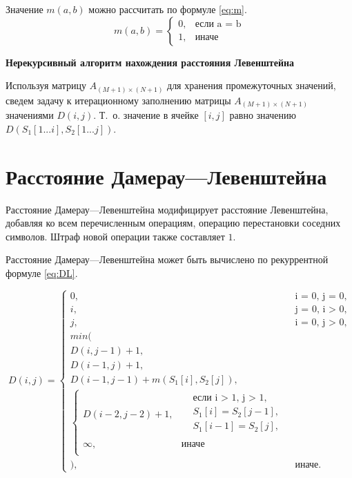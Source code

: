 Значение $ m(a, b) $ можно рассчитать по формуле \eqref{eq:m}.
\begin{equation}
	\label{eq:m}
	m(a, b) = \begin{cases}
		0, &\text{если a = b}\\
		1, &\text{иначе}
	\end{cases}
\end{equation}

\textbf{Нерекурсивный алгоритм нахождения расстояния Левенштейна}

Используя матрицу $ A_{(M+1) \times (N+1)} $ для хранения промежуточных значений, сведем задачу к итерационному заполнению матрицы $ A_{(M+1) \times (N+1)} $ значениями $ D(i, j) $.
Т.~о. значение в ячейке $ [i, j] $ равно значению $ D(S_1[1...i], S_2[1...j]) $.

\section{Расстояние Дамерау---Левенштейна}

Расстояние Дамерау---Левенштейна модифицирует расстояние Левенштейна, добавляя ко всем перечисленным операциям, операцию перестановки соседних символов.
Штраф новой операции также составляет $ 1 $. 

Расстояние Дамерау---Левенштейна может быть вычислено по рекуррентной формуле \eqref{eq:DL}.

\begin{equation}
	\label{eq:DL}
	D(i, j) = 
	\begin{cases}
		0, &\text{i = 0, j = 0,}\\
		i, &\text{j = 0, i > 0,}\\
		j, &\text{i = 0, j > 0,}\\
		min(\\
		D(i, j - 1) + 1,\\
		D(i - 1, j) + 1,\\ 
		D(i - 1, j - 1) + m(S_{1}[i], S_{2}[j]), \\
		\begin{cases}
			D(i - 2, j - 2) + 1, & \begin{aligned}
				& \text{если i > 1, j > 1}, \\
				& S_{1}[i] = S_{2}[j - 1], \\
				& S_{1}[i - 1] = S_{2}[j], \\
			\end{aligned}\\
			\infty, & \textrm{иначе} \\
		\end{cases} \\
		), & \textrm{иначе.}
	\end{cases}
\end{equation}

